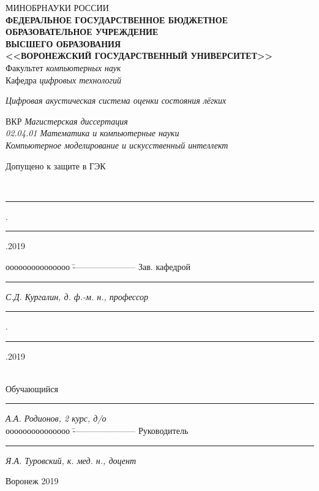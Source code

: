 \documentclass[../main.tex]{subfiles}
\begin{document}
\begin{spacing}{1.2}
{
\begin{small}
\thispagestyle{empty}
\center 
{МИНОБРНАУКИ РОССИИ}\\ \!
{\footnotesize\textbf{ФЕДЕРАЛЬНОЕ ГОСУДАРСТВЕННОЕ БЮДЖЕТНОЕ ОБРАЗОВАТЕЛЬНОЕ УЧРЕЖДЕНИЕ}\\ \!\!\textbf{ВЫСШЕГО ОБРАЗОВАНИЯ}}\\ \!\!\!\!
\textbf{<<ВОРОНЕЖСКИЙ ГОСУДАРСТВЕННЫЙ УНИВЕРСИТЕТ>>}\\
\vspace{1.5cm}
{Факультет \textit{компьютерных наук}}\\
\vspace{0.25cm}
{Кафедра \textit{цифровых технологий}}\\

\vspace{2cm}

\textit{Цифровая акустическая система оценки состояния лёгких}\\

\vspace{1cm}

{ВКР} \textit{Магистерская диссертация}\\
\textit{02.04.01 Математика и компьютерные науки}\\
\textit{Компьютерное моделирование и искусственный интеллект}\\

\vspace{2cm}
\begin{flushleft}
{Допущено к защите в ГЭК}{\ \ \rule[0mm]{5mm}{0,3mm}.\rule[0mm]{5mm}{0,3mm}.2019}
\end{flushleft}
\begin{tabbing}
ооооооооооооооо	\=	----------------------	\kill
Зав. кафедрой\> 	\rule[0mm]{3cm}{0,3mm}	\textit{С.Д. Кургалин, д. ф.-м. н., профессор}{ \rule[0mm]{5mm}{0,3mm}.\rule[0mm]{5mm}{0,3mm}.2019}  \\
Обучающийся \> 	\rule[0mm]{3cm}{0,3mm}	\textit{А.А. Родионов, 2 курс, д/о} \\ 
ооооооооооооооо	\=	----------------------	\kill
Руководитель\> 	\rule[0mm]{3cm}{0,3mm}  \textit{Я.А. Туровский, к. мед. н., доцент }
\end{tabbing}

\vspace{4cm}

\centerline{Воронеж 2019}
\end{small}
}
\end{spacing}
\clearpage
\end{document}
